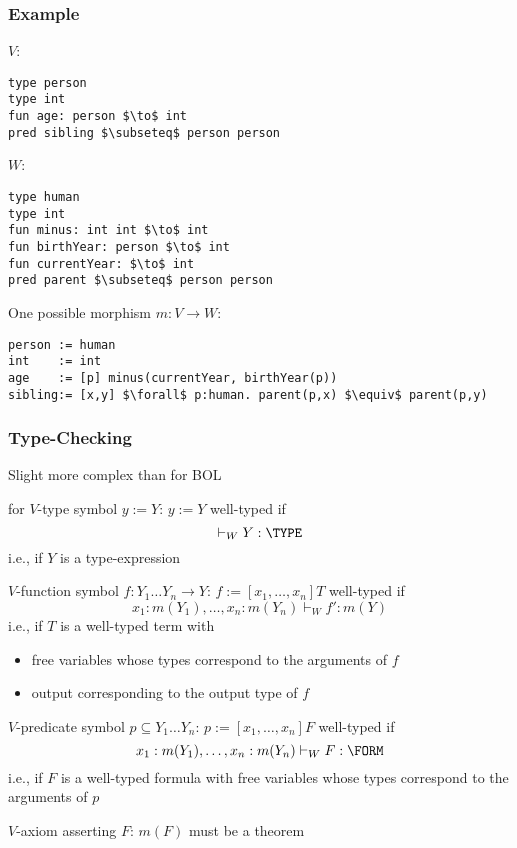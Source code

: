 \begin{frame}[fragile]\frametitle{Example}
$V$:
\begin{lstlisting}[basicstyle={\footnotesize\color{gray}}]
type person
type int
fun age: person $\to$ int
pred sibling $\subseteq$ person person
\end{lstlisting}

$W$:
\begin{lstlisting}[basicstyle={\footnotesize\color{gray}}]
type human
type int
fun minus: int int $\to$ int
fun birthYear: person $\to$ int
fun currentYear: $\to$ int
pred parent $\subseteq$ person person
\end{lstlisting}

One possible morphism $m:V\to W$:
\begin{lstlisting}[basicstyle={\footnotesize\color{gray}}]
person := human
int    := int
age    := [p] minus(currentYear, birthYear(p))
sibling:= [x,y] $\forall$ p:human. parent(p,x) $\equiv$ parent(p,y)
\end{lstlisting}
\end{frame}

\begin{frame}\frametitle{Type-Checking}
\begin{blockitems}{Slight more complex than for BOL}
\item for $V$-type symbol $y:=Y$: $y:=Y$ well-typed if
 \[\vdash_W Y: \TYPE\]
i.e., if $Y$ is a type-expression
\item $V$-function symbol $f:Y_1 \ldots Y_n\to Y$: $f:=[x_1,\ldots,x_n]T$ well-typed if
 \[x_1:m(Y_1),\ldots,x_n:m(Y_n)\vdash_W f': m(Y)\]
i.e., if $T$ is a well-typed term with
 \begin{itemize}
  \item free variables whose types correspond to the arguments of $f$
  \item output corresponding to the output type of $f$
 \end{itemize}
\item $V$-predicate symbol $p\subseteq Y_1\ldots Y_n$: $p:=[x_1,\ldots,x_n]F$ well-typed if
 \[x_1:m(Y_1),\ldots,x_n:m(Y_n)\vdash_W F: \FORM\]
i.e., if $F$ is a well-typed formula with free variables whose types correspond to the arguments of $p$
\item $V$-axiom asserting $F$: $m(F)$ must be a theorem
\end{blockitems}
\end{frame}

